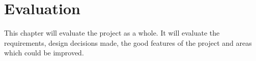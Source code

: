 \chapter{Evaluation}






This chapter will evaluate the project as a whole. It will evaluate the requirements, design decisions made, the good features of the project and areas which could be improved.

